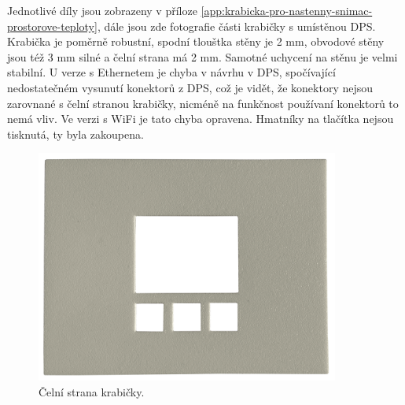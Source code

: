 Jednotlivé díly jsou zobrazeny v příloze \ref{app:krabicka-pro-nastenny-snimac-prostorove-teploty}, dále jsou zde fotografie části krabičky s umístěnou DPS. Krabička je poměrně robustní, spodní tlouštka stěny je 2 mm, obvodové stěny jsou též 3 mm silné a čelní strana má 2 mm. Samotné uchycení na stěnu je velmi stabilní. U verze s Ethernetem je chyba v návrhu v DPS, spočívající nedostatečném vysunutí konektorů z DPS, což je vidět, že konektory nejsou zarovnané s čelní stranou krabičky, nicméně na funkčnost používaní konektorů to nemá vliv. Ve verzi s WiFi je tato chyba opravena. Hmatníky na tlačítka nejsou tisknutá, ty byla zakoupena.
 
\begin{figure}[H]
    \centering
    \includegraphics[width=0.89\textwidth]{images/krabicka-nastenny-snimac-prostorove-teploty/krabicka-nastenny-snimac-prostorove-teploty-predni-strana.png}
    \caption{Čelní strana krabičky.}
    \label{fig:krabicka-nastenny-snimac-prostorove-teploty-predni-strana}
\end{figure}

